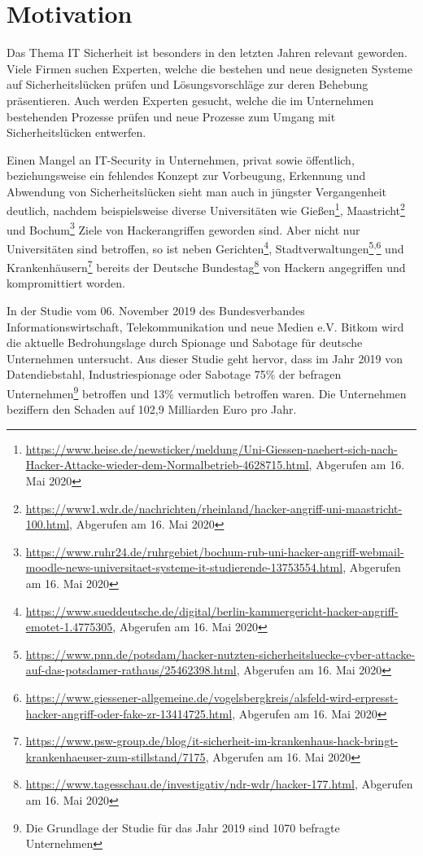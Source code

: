 \section{Motivation}
Das Thema IT Sicherheit ist besonders in den letzten Jahren relevant geworden. Viele Firmen suchen Experten\cite{ITSecurityExpertenWerdenHanderingend2019}, welche die bestehen und neue designeten Systeme auf Sicherheitslücken prüfen und Lösungsvorschläge zur deren Behebung präsentieren. Auch werden Experten gesucht, welche die im Unternehmen bestehenden Prozesse prüfen und neue Prozesse zum Umgang mit Sicherheitslücken entwerfen.

Einen Mangel an IT-Security in Unternehmen, privat sowie öffentlich, beziehungsweise ein fehlendes Konzept zur Vorbeugung, Erkennung und Abwendung von Sicherheitslücken sieht man auch in jüngster Vergangenheit deutlich, nachdem beispielsweise diverse Universitäten wie Gießen\footnote{\url{https://www.heise.de/newsticker/meldung/Uni-Giessen-naehert-sich-nach-Hacker-Attacke-wieder-dem-Normalbetrieb-4628715.html}, Abgerufen am 16. Mai 2020}, Maastricht\footnote{\url{https://www1.wdr.de/nachrichten/rheinland/hacker-angriff-uni-maastricht-100.html}, Abgerufen am 16. Mai 2020} und Bochum\footnote{\url{https://www.ruhr24.de/ruhrgebiet/bochum-rub-uni-hacker-angriff-webmail-moodle-news-universitaet-systeme-it-studierende-13753554.html}, Abgerufen am 16. Mai 2020} Ziele von Hackerangriffen geworden sind. Aber nicht nur Universitäten sind betroffen, so ist neben Gerichten\footnote{\url{https://www.sueddeutsche.de/digital/berlin-kammergericht-hacker-angriff-emotet-1.4775305}, Abgerufen am 16. Mai 2020}, Stadtverwaltungen\footnote{\url{https://www.pnn.de/potsdam/hacker-nutzten-sicherheitsluecke-cyber-attacke-auf-das-potsdamer-rathaus/25462398.html}, Abgerufen am 16. Mai 2020}\textsuperscript{,}\footnote{\url{https://www.giessener-allgemeine.de/vogelsbergkreis/alsfeld-wird-erpresst-hacker-angriff-oder-fake-zr-13414725.html}, Abgerufen am 16. Mai 2020} und Krankenhäusern\footnote{\url{https://www.psw-group.de/blog/it-sicherheit-im-krankenhaus-hack-bringt-krankenhaeuser-zum-stillstand/7175}, Abgerufen am 16. Mai 2020} bereits der Deutsche Bundestag\footnote{\url{https://www.tagesschau.de/investigativ/ndr-wdr/hacker-177.html}, Abgerufen am 16. Mai 2020} von Hackern angegriffen und kompromittiert worden.

In der Studie  vom 06. November 2019 des Bundesverbandes Informationswirtschaft, Telekommunikation und neue Medien e.V. Bitkom wird die aktuelle Bedrohungslage durch Spionage und Sabotage für deutsche Unternehmen untersucht. Aus dieser Studie geht hervor, dass im Jahr 2019 von Datendiebstahl, Industriespionage oder Sabotage 75\% der befragen Unternehmen\footnote{Die Grundlage der Studie für das Jahr 2019 sind 1070 befragte Unternehmen} betroffen  und 13\% vermutlich betroffen waren. Die Unternehmen beziffern den Schaden auf 102,9 Milliarden Euro pro Jahr.\cite{bergWirtschaftsschutzDigitalenWelt2019}

